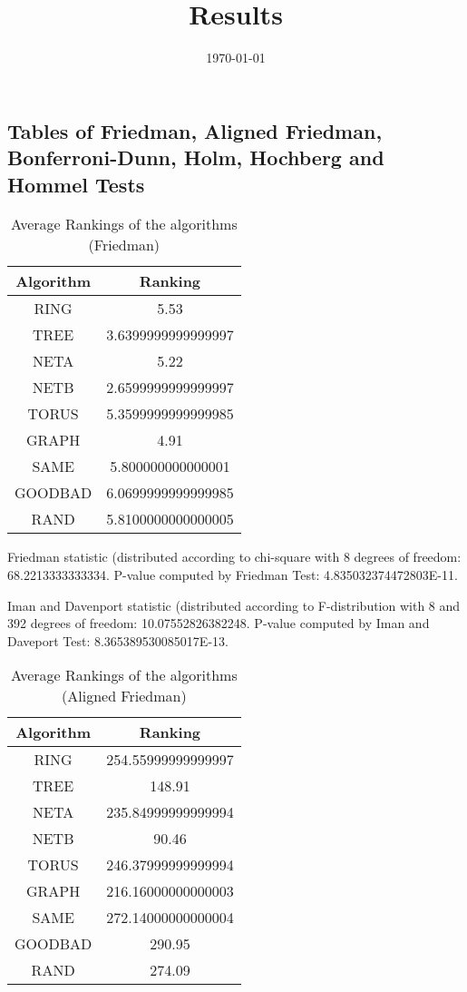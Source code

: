 \documentclass[a4paper,10pt]{article}
\title{Results}
\author{}
\date{\today}
\begin{document}
\begin{landscape}
\oddsidemargin 0in \topmargin 0in\maketitle
\section{Tables of Friedman, Aligned Friedman, Bonferroni-Dunn, Holm, Hochberg and Hommel Tests}
\begin{table}[!htp]
\centering
\caption{Average Rankings of the algorithms (Friedman)
}\begin{tabular}{c|c}
Algorithm&Ranking\\
\hline
 RING&5.53\\
 TREE&3.6399999999999997\\
 NETA&5.22\\
 NETB&2.6599999999999997\\
 TORUS&5.3599999999999985\\
 GRAPH&4.91\\
 SAME&5.800000000000001\\
 GOODBAD&6.0699999999999985\\
 RAND&5.8100000000000005\\
\end{tabular}
\end{table}


Friedman statistic (distributed according to chi-square with 8 degrees of freedom: 68.2213333333334. 
P-value computed by Friedman Test: 4.835032374472803E-11.\newline

Iman and Davenport statistic (distributed according to F-distribution with 8 and 392 degrees of freedom: 10.07552826382248. 
P-value computed by Iman and Daveport Test: 8.365389530085017E-13.\newline


\newpage

\begin{table}[!htp]
\centering
\caption{Average Rankings of the algorithms (Aligned Friedman)
}\begin{tabular}{c|c}
Algorithm&Ranking\\
\hline
 RING&254.55999999999997\\
 TREE&148.91\\
 NETA&235.84999999999994\\
 NETB&90.46\\
 TORUS&246.37999999999994\\
 GRAPH&216.16000000000003\\
 SAME&272.14000000000004\\
 GOODBAD&290.95\\
 RAND&274.09\\
\end{tabular}
\end{table}



\end{landscape}
\end{document}
